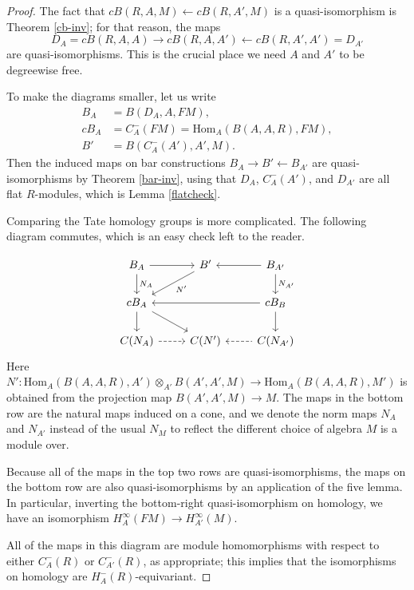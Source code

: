 \documentclass{memo-l}
\theoremstyle{definition}
\theoremstyle{remark}
\numberwithin{section}{chapter}
\numberwithin{equation}{chapter}
\begin{document}
\begin{proof}
The fact that $cB(R,A,M) \leftarrow cB(R,A', M)$ is a quasi-isomorphism is Theorem \ref{cb-inv}; for that reason, the maps $$D_A = cB(R,A,A) \to cB(R,A,A') \leftarrow cB(R,A',A') = D_{A'}$$ are quasi-isomorphisms. This is the crucial place we need $A$ and $A'$ to be degreewise free. 

To make the diagrams smaller, let us write 
\begin{align*}B_A &= B(D_A, A, FM), \\
cB_A &= C^-_A(FM) = \text{Hom}_A(B(A,A,R), FM), \\
B' &= B(C^-_A(A'), A', M).\end{align*}
Then the induced maps on bar constructions $B_A \to B' \leftarrow B_{A'}$ are quasi-isomorphisms by Theorem \ref{bar-inv}, using that $D_A$, $C^-_A(A')$, and $D_{A'}$ are all flat $R$-modules, which is Lemma \ref{flatcheck}. 

Comparing the Tate homology groups is more complicated. The following diagram commutes, which is an easy check left to the reader. 

$$\begin{tikzcd}
B_A \arrow{r} \arrow{d}{N_A} & B' \arrow{ld}{N'} \arrow[leftarrow]{r} & B_{A'} \arrow{d}{N_{A'}} \\
cB_A \arrow{d} \arrow{rd} \arrow[leftarrow]{rr} & {} & cB_B \arrow{d} \\
C(N_A) \arrow[dashrightarrow]{r} &C(N') \arrow[dashleftarrow]{r} &C(N_{A'})
\end{tikzcd}$$
\newline
Here $N': \text{Hom}_A(B(A,A,R), A') \otimes_{A'} B(A',A',M) \to \text{Hom}_A(B(A,A,R), M')$ is obtained from the projection map $B(A', A', M) \to M$. The maps in the bottom row are the natural maps induced on a cone, and we denote the norm maps $N_A$ and $N_{A'}$ instead of the usual $N_M$ to reflect the different choice of algebra $M$ is a module over.

Because all of the maps in the top two rows are quasi-isomorphisms, the maps on the bottom row are also quasi-isomorphisms by an application of the five lemma. In particular, inverting the bottom-right quasi-isomorphism on homology, we have an isomorphism $H^\infty_A(FM) \to H^\infty_{A'}(M)$.

All of the maps in this diagram are module homomorphisms with respect to either $C^-_A(R)$ or $C^-_{A'}(R)$, as appropriate; this implies that the isomorphisms on homology are $H^-_A(R)$-equivariant. 
\end{proof}
\end{document}

